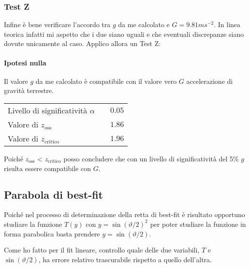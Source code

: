 \documentclass{article}
\begin{document}
	\subsubsection{Test Z}
	Infine è bene verificare l'accordo tra $g$ da me calcolato e $G = 9.81 ms^{-2}$. In linea teorica infatti mi aspetto che i due siano uguali e che eventuali discrepanze siano dovute unicamente al caso. Applico allora un Test Z:
	
	\paragraph{Ipotesi nulla} Il valore $g$ da me calcolato è compatibile con il valore vero $G$ accelerazione di gravità terrestre.
	
	\vspace{0.7cm}
	\begin{table}[H]
		\centering
		\begin{tabular}{lr}
			Livello di significatività $\alpha$	& $\quad 0.05$  \\
			Valore di $z_\text{oss}$             	& $\quad 1.86$  \\
			Valore di $z_{\text{critico}}$ 		& $\quad 1.96$  \\ 
		\end{tabular}
	\end{table}
	\vspace{0.7cm}
	
	\noindent
	Poiché $z_\text{oss}$ < $z_{\text{critico}}$ posso concludere che con un livello di significatività del 5\% $g$ risulta essere compatibile con $G$.
	
	
	\subsection{Parabola di best-fit}
	Poiché nel processo di determinazione della retta di best-fit è risultato opportuno studiare la funzione $T(y)$ con $y = \sin{\left( \vartheta / 2\right)}^2$ per poter studiare la funzione in forma parabolica basta prendere $y =  \sin{\left( \vartheta / 2\right)}$.
	
	Come ho fatto per il fit lineare, controllo quale delle due variabili, $T$ e $ \sin{\left( \vartheta / 2\right)}$, ha errore relativo trascurabile rispetto a quello dell'altra.
	
\end{document}
